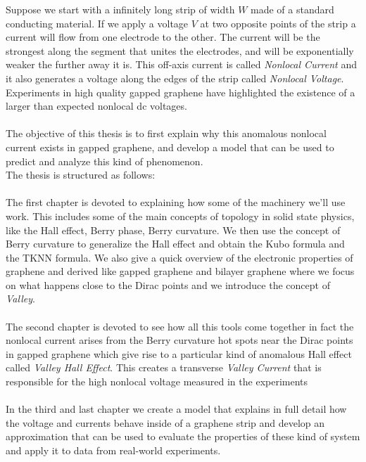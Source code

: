 	Suppose we start with a infinitely long strip of width $W$ made of a standard conducting material. If we apply a voltage $V$ at two opposite points of the strip a current will flow from one electrode to the other. The current will be the strongest along the segment that unites the electrodes, and will be exponentially weaker the further away it is. This off-axis current is called \textit{Nonlocal Current} and it also generates a voltage along the edges of the strip called \textit{Nonlocal Voltage}.\\
    Experiments in high quality gapped graphene have highlighted the existence of a larger than expected nonlocal dc voltages.\\\\
    The objective of this thesis is to first explain why this anomalous nonlocal current exists in gapped graphene, and develop a model that can be used to predict and analyze this kind of phenomenon.\\
    The thesis is structured as follows:\\\\
    The first chapter is devoted to explaining how some of the machinery we'll use work. This includes some of the main concepts of topology in solid state physics, like the Hall effect, Berry phase, Berry curvature. We then use the concept of Berry curvature to generalize the Hall effect and obtain the Kubo formula and the TKNN formula. We also give a quick overview of the electronic properties of graphene and derived like gapped graphene and bilayer graphene where we focus on what happens close to the Dirac points and we introduce the concept of \textit{Valley}.\\\\
    The second chapter is devoted to see how all this tools come together in fact the nonlocal current arises from the Berry curvature hot spots near the Dirac points in gapped graphene which give rise to a particular kind of anomalous Hall effect called \textit{Valley Hall Effect}. This creates a transverse \textit{Valley Current} that is responsible for the high nonlocal voltage measured in the experiments\\\\
    In the third and last chapter we create a model that explains in full detail how the voltage and currents behave inside of a graphene strip and develop an approximation that can be used to evaluate the properties of these kind of system and apply it to data from real-world experiments.